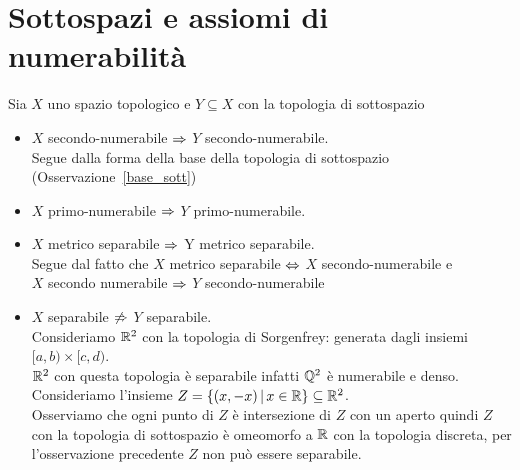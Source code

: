 \section{Sottospazi e assiomi di numerabilit\`a}

\begin{oss}Sia $X$ uno spazio topologico e $Y\subseteq X$ con la topologia di sottospazio
\begin{itemize}
\item $X$ secondo-numerabile $\Rightarrow$ $Y$ secondo-numerabile.\\
Segue dalla forma della base della topologia di sottospazio (Osservazione~\ref{base_sott})
\item $X$ primo-numerabile $\Rightarrow$ $Y$ primo-numerabile.
\item $X$ metrico separabile $\Rightarrow$ Y metrico separabile.\\
Segue dal fatto che 
$X$ metrico separabile $\Leftrightarrow$ $X$ secondo-numerabile e \\
$X$ secondo numerabile $\Rightarrow$  $Y$ secondo-numerabile 
\item $X$ separabile $\not \Rightarrow$ $Y$ separabile.\\
Consideriamo $\mathbb{R}^2$ con la topologia di Sorgenfrey: generata dagli insiemi  $[a,b)\times [c,d)$.\\
$\mathbb{R}^2$ con questa topologia \`e separabile infatti $\mathbb{Q}^2$ \`e numerabile e denso.\\
Consideriamo l'insieme $Z=\{ (x,-x) \, \vert \, x\in \mathbb{R} \} \subseteq \mathbb{R}^2$.\\
Osserviamo che ogni punto di $Z$ \`e intersezione di $Z$ con un aperto quindi $Z$ con la topologia di sottospazio \`e omeomorfo a $\mathbb{R}$ con la topologia discreta, per l'osservazione precedente $Z$ non pu\`o essere separabile.
\end{itemize}
\end{oss}

